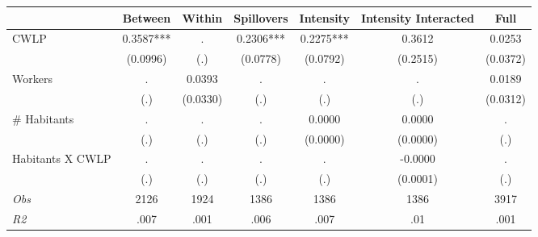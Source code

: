\begin{tabular}{l*{6}{c}}\hline&\multicolumn{1}{c}{Between}&\multicolumn{1}{c}{Within}&\multicolumn{1}{c}{Spillovers}&\multicolumn{1}{c}{Intensity}&\multicolumn{1}{c}{Intensity Interacted}&\multicolumn{1}{c}{Full}\\ \hline 
CWLP & 0.3587*** & . & 0.2306*** & 0.2275*** & 0.3612 & 0.0253 \\
 & (0.0996) & (.) & (0.0778) & (0.0792) & (0.2515) & (0.0372) \\
Workers & . & 0.0393 & . & . & . & 0.0189 \\
 & (.) & (0.0330) & (.) & (.) & (.) & (0.0312) \\
\# Habitants & . & . & . & 0.0000 & 0.0000 & . \\
 & (.) & (.) & (.) & (0.0000) & (0.0000) & (.) \\
Habitants X CWLP & . & . & . & . & -0.0000 & . \\
 & (.) & (.) & (.) & (.) & (0.0001) & (.) \\
\hline \textit{Obs} & 2126 & 1924 & 1386 & 1386 & 1386 & 3917 \\ \textit{R2} & .007 & .001 & .006 & .007 & .01 & .001 \\ \hline \end{tabular}
